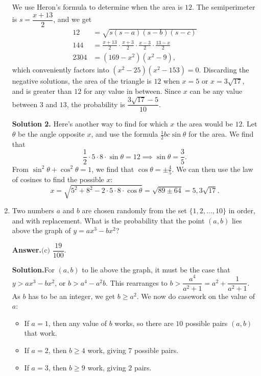 \documentclass[11pt,paper=letter]{scrartcl}
\newcommand{\ans}{{\sffamily \bfseries Answer.}\;}
\newcommand{\sol}{{\sffamily \bfseries Solution.}\;}
\newcommand{\soln}[1]{{\sffamily \bfseries Solution #1.}\;}
\begin{document}
\begin{enumerate}[align=left,leftmargin=*,resume]
We use Heron's formula to determine when the area is $12$. The semiperimeter is $s = \dfrac{x + 13}{2}$, and we get
\begin{align*}
  12 &= \sqrt{s(s-a)(s-b)(s-c)} \\
  144 &= \frac{x + 13}{2}\cdot \frac{x + 3}{2} \cdot \frac{x - 3}{2} \cdot \frac{13 - x}{2} \\
  2304 &= (169 - x^2)(x^2 - 9),
\end{align*}
which conveniently factors into $(x^2 - 25)(x^2 - 153) = 0$. Discarding the negative solutions, the area of the triangle is $12$ when $x = 5$ or $x = 3\sqrt{17}$, and is greater than $12$ for any value in between. Since $x$ can be any value between $3$ and $13$, the probability is $\dfrac{3\sqrt{17} - 5}{10}$.

\soln2 Here's another way to find for which $x$ the area would be $12$. Let $\theta$ be the angle opposite $x$, and use the formula $\frac{1}{2}bc \sin \theta$ for the area. We find that $$\frac{1}{2}\cdot5\cdot8\cdot\sin \theta = 12 \implies \sin \theta = \frac{3}{5}.$$ From $\sin^2 \theta + \cos^2 \theta = 1$, we find that $\cos \theta = \pm\frac{4}{5}$. We can then use the law of cosines to find the possible $x$:
$$x = \sqrt{5^2 + 8^2 - 2\cdot5\cdot8\cdot\cos \theta} = \sqrt{89 \pm 64} = 5, 3\sqrt{17}.$$

\item Two numbers $a$ and $b$ are chosen randomly from the set $\{1, 2, \ldots, 10\}$ in order, and with replacement. What is the probability that the point $(a, b)$ lies above the graph of $y = ax^{3} - bx^2$?


\ans $\boxed{\text{(c) }\dfrac{19}{100}}$.

\sol For $(a, b)$ to lie above the graph, it must be the case that $y > ax^3 - bx^2$, or $b > a^4 - a^2b$. This rearranges to $b > \dfrac{a^4}{a^2 + 1} = a^2 + \dfrac{1}{a^2 + 1}$. As $b$ has to be an integer, we get $b \ge a^2$. We now do casework on the value of $a$:

\begin{itemize}[itemsep=-0.7ex]
  \item If $a = 1$, then any value of $b$ works, so there are $10$ possible pairs $(a, b)$ that work.

  \item If $a = 2$, then $b \ge 4$ work, giving $7$ possible pairs.

  \item If $a = 3$, then $b \ge 9$ work, giving $2$ pairs.


\end{itemize}
\end{enumerate}
\end{document}
